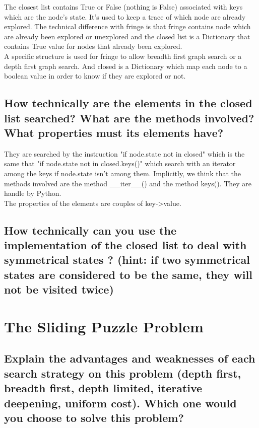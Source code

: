 \documentclass[a4paper,10pt]{article}
\begin{document}
	The closest list contains True or False (nothing is False) associated with keys which are the node's state. It's used to keep a trace of which node are already explored. The technical difference with fringe is that fringe contains node which are already been explored or unexplored and the closed list is a Dictionary that contains True value for nodes that already been explored. \\ A specific structure is used for fringe to allow breadth first graph search or a depth first graph search. And closed is a Dictionary which map each node to a boolean value in order to know if they are explored or not.
	
	\subsection{How technically are the elements in the closed list searched? What are the
methods involved? What properties must its elements have?}
	
	They are searched by the instruction "if node.state not in closed" which is the same that "if node.state not in closed.keys()" which search with an iterator among the keys if node.state isn't among them. Implicitly, we think that the  methods involved are the method \_\_iter\_\_() and the method keys(). They are handle by Python.\\
	The properties of the elements are couples of key->value.
	
	\subsection{How technically can you use the implementation of the closed list to deal with symmetrical states ? (hint: if two symmetrical states are considered to be the same, they will not be visited twice)}
	
	
	
\section{The Sliding Puzzle Problem}

	\subsection{Explain the advantages and weaknesses of each search strategy on this problem (depth first, breadth first, depth limited, iterative deepening, uniform cost). Which one would you choose to solve this problem?}
	
\end{document}
